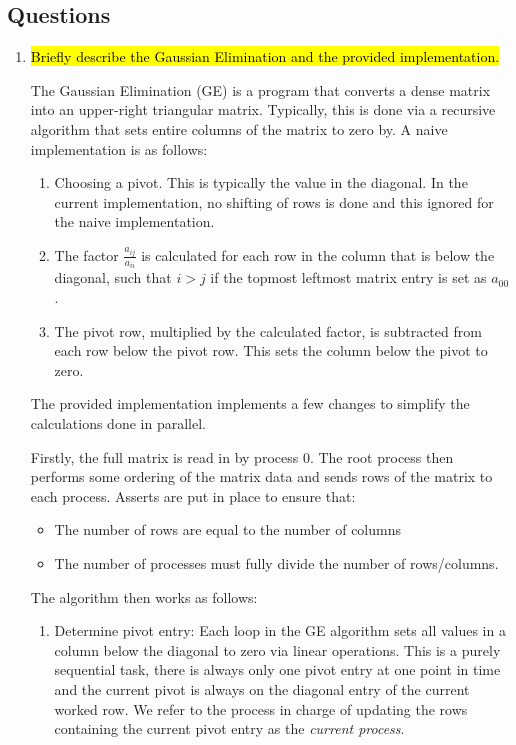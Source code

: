 \subsection{Questions}
\begin{enumerate}
	\item \hl{Briefly describe the Gaussian Elimination and the provided implementation.}

	The Gaussian Elimination (GE) is a program that converts a dense matrix into an upper-right triangular matrix. Typically, this is done via a recursive algorithm that sets entire columns of the matrix to zero by. A naive implementation is as follows:
\begin{enumerate}
	\item Choosing a pivot. This is typically the value in the diagonal. In the current implementation, no shifting of rows is done and this ignored for the naive implementation.
	\item The factor $\frac{a_{ij}}{a_{ii}}$ is calculated for each row in the column that is below the diagonal, such that $i > j$ if the topmost leftmost matrix entry is set as $a_{00}$.
	\item The pivot row, multiplied by the calculated factor, is subtracted from each row below the pivot row. This sets the column below the pivot to zero.
\end{enumerate}

The provided implementation implements a few changes to simplify the calculations done in parallel.

Firstly, the full matrix is read in by process 0. The root process then performs some ordering of the matrix data and sends rows of the matrix to each process. Asserts are put in place to ensure that:
\begin{itemize}
	\item The number of rows are equal to the number of columns
	\item The number of processes must fully divide the number of rows/columns.
\end{itemize}

The algorithm then works as follows:
\begin{enumerate}
\item Determine pivot entry: Each loop in the GE algorithm sets all values in a column below the diagonal to zero via linear operations. This is a purely sequential task, there is always only one pivot entry at one point in time and the current pivot is always on the diagonal entry of the current worked row. We refer to the process in charge of updating the rows containing the current pivot entry as the \textit{current process}. 


\end{enumerate}
\end{enumerate}

